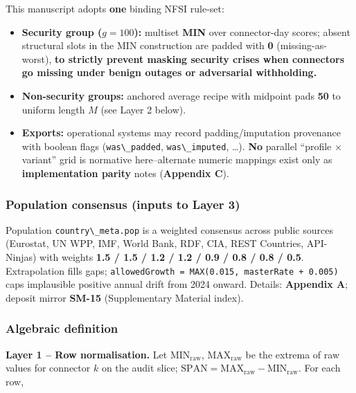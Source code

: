 \documentclass[
  11pt,
  peerreview,journal,onecolumn]{IEEEtran}
\newcommand{\passthrough}[1]{#1}
\providecommand{\tightlist}{%
  \setlength{\itemsep}{0pt}\setlength{\parskip}{0pt}}
\begin{document}
This manuscript adopts \textbf{one} binding NFSI rule-set:

\begin{itemize}
\tightlist
\item
  \textbf{Security group (\(g=100\)):} multiset \textbf{MIN} over
  connector-day scores; absent structural slots in the MIN construction
  are padded with \textbf{0} (missing-as-worst), \textbf{to strictly
  prevent masking security crises when connectors go missing under
  benign outages or adversarial withholding.}\\
\item
  \textbf{Non-security groups:} anchored average recipe with midpoint
  pads \textbf{50} to uniform length \(M\) (see Layer 2 below).\\
\item
  \textbf{Exports:} operational systems may record padding/imputation
  provenance with boolean flags (\passthrough{\lstinline!was\_padded!},
  \passthrough{\lstinline!was\_imputed!}, \ldots). \textbf{No} parallel
  ``profile × variant'' grid is normative here--alternate numeric
  mappings exist only as \textbf{implementation parity} notes
  (\textbf{Appendix C}).
\end{itemize}

\hypertarget{population-consensus-inputs-to-layer-3}{%
\subsubsection{Population consensus (inputs to Layer
3)}\label{population-consensus-inputs-to-layer-3}}

Population \passthrough{\lstinline!country\_meta.pop!} is a weighted
consensus across public sources (Eurostat, UN WPP, IMF, World Bank, RDF,
CIA, REST Countries, API-Ninjas) with weights \textbf{1.5 / 1.5 / 1.2 /
1.2 / 0.9 / 0.8 / 0.8 / 0.5}. Extrapolation fills gaps;
\passthrough{\lstinline!allowedGrowth = MAX(0.015, masterRate + 0.005)!}
caps implausible positive annual drift from 2024 onward. Details:
\textbf{Appendix A}; deposit mirror \textbf{SM-15} (Supplementary
Material index).

\hypertarget{algebraic-definition}{%
\subsubsection{Algebraic definition}\label{algebraic-definition}}

\textbf{Layer 1 -- Row normalisation.} Let
\(\mathrm{MIN}_{\mathrm{raw}}\), \(\mathrm{MAX}_{\mathrm{raw}}\) be the
extrema of raw values for connector \(k\) on the audit slice;
\(\mathrm{SPAN}=\mathrm{MAX}_{\mathrm{raw}}-\mathrm{MIN}_{\mathrm{raw}}\).
For each row,
\end{document}
